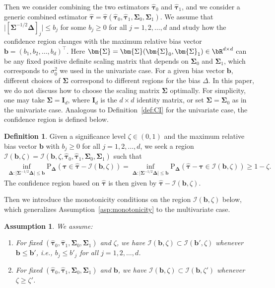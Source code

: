 \documentclass[11pt]{article}
\def\P{{\mathrm P}}
\def\cI{{\mathcal I}}
\newcommand{\htau}{\widehat\tau}
\numberwithin{equation}{section}
\newtheorem{assumption}{Assumption}[section]
\theoremstyle{definition}
\newtheorem{definition}{Definition}[section]
\begin{document}
Then we consider combining the two estimators $\bm{\htau}_0$ and $\bm{\htau}_1$, and we consider a generic combined estimator $\bm{\hat\tau} = \bm{\hat\tau}(\bm{\htau}_0, \bm{\htau}_1, \bm{\Sigma}_0, \bm{\Sigma}_1)$. We assume that $\lvert [\bm{\Sigma}^{-1/2} \bm{\Delta}]_j \rvert \le b_j$ for some $b_j \ge 0$ for all $j=1,2,\ldots,d$ and study how the confidence region changes with the maximum relative bias vector $\bm{b} = (b_1, b_2, \ldots, b_d)^\top$. Here $\bm{\Sigma} = \bm{\Sigma}(\bm{\Sigma}_0, \bm{\Sigma}_1) \in \bR^{d \times d}$ can be any fixed positive definite scaling matrix that depends on $\bm{\Sigma}_0$ and $\bm{\Sigma}_1$, which corresponds to $\sigma_0^2$ we used in the univariate case. For a given bias vector $\bm{b}$, different choices of $\bm{\Sigma}$ correspond to different regions for the bias $\Delta$. In this paper, we do not discuss how to choose the scaling matrix $\bm{\Sigma}$ optimally. For simplicity, one may take $\bm{\Sigma} = \bm{I}_d$, where $\bm{I}_d$ is the $d \times d$ identity matrix, or set $\bm{\Sigma} = \bm{\Sigma}_0$ as in the univariate case. Analogous to Definition~\ref{def:CI} for the univariate case, the confidence region is defined below.

\begin{definition}\label{def:CI_multi}
Given a significance level $\zeta \in (0,1)$ and the maximum relative bias vector $\bm{b}$ with $b_j \ge 0$ for all $j=1,2,\ldots,d$, we seek a region $\bm{\cI}(\bm{b}, \zeta) = \bm{\cI}(\bm{b}, \zeta, \bm{\htau}_0, \bm{\htau}_1, \bm{\Sigma}_0, \bm{\Sigma}_1)$ such that
\begin{align}\label{eq:coverage_multi}
  \inf_{\bm{\Delta}: \lvert \bm{\Sigma}^{-1/2} \bm{\Delta}\rvert \le \bm{b}} \P_{\bm{\Delta}}(\bm{\tau} \in \bm{\hat\tau} - \bm{\cI}(\bm{b}, \zeta)) 
  = \inf_{\bm{\Delta}: \lvert \bm{\Sigma}^{-1/2} \bm{\Delta}\rvert \le \bm{b}} \P_{\bm{\Delta}}(\bm{\hat\tau} - \bm{\tau} \in \bm{\cI}(\bm{b}, \zeta)) \ge 1 - \zeta.
\end{align}
The confidence region based on $\bm{\hat\tau}$ is then given by $\bm{\hat\tau}-\bm{\cI}(\bm{b},\zeta)$.
\end{definition}


Then we introduce the monotonicity conditions on the region $\bm{\cI}(\bm{b},\zeta)$ below, which generalizes Assumption~\ref{asp:monotonicity} to the multivariate case.

\begin{assumption}\label{asp:monotonicity_multi}
  We assume:
  \begin{enumerate}
    \item For fixed $(\bm{\htau}_0, \bm{\htau}_1, \bm{\Sigma}_0, \bm{\Sigma}_1)$ and $\zeta$, we have $\bm{\cI}(\bm{b}, \zeta) \subset \bm{\cI}(\bm{b'}, \zeta)$ whenever $\bm{b} \le \bm{b'}$, i.e., $b_j \le b'_j$ for all $j=1,2,\ldots,d$.
    \item For fixed $(\bm{\htau}_0, \bm{\htau}_1, \bm{\Sigma}_0, \bm{\Sigma}_1)$ and $\bm{b}$, we have $\bm{\cI}(\bm{b}, \zeta) \subset \bm{\cI}(\bm{b}, \zeta')$ whenever $\zeta \ge \zeta'$.
  \end{enumerate}
\end{assumption}
\end{document}
